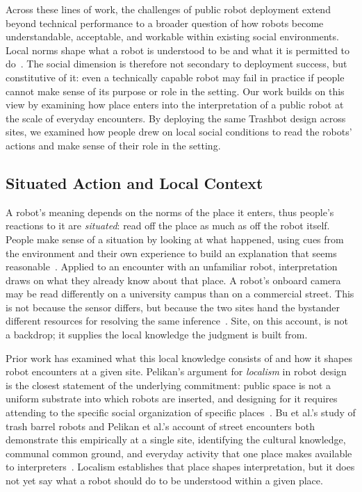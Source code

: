 Across these lines of work, the challenges of public robot deployment extend beyond technical performance to a broader question of how robots become understandable, acceptable, and workable within existing social environments. Local norms shape what a robot is understood to be and what it is permitted to do~\cite{while2021urban}. The social dimension is therefore not secondary to deployment success, but constitutive of it: even a technically capable robot may fail in practice if people cannot make sense of its purpose or role in the setting. 
Our work builds on this view by examining how place enters into the interpretation of a public robot at the scale of everyday encounters. By deploying the same Trashbot design across sites, we examined how people drew on local social conditions to read the robots' actions and make sense of their role in the setting.
  
  \subsection{Situated Action and Local Context} \label{sec:situated}
A robot's meaning depends on the norms of the place it enters, thus people's reactions to it are \textit{situated}: read off the place as much as off the robot itself. People make sense of a situation by looking at what happened, using cues from the environment and their own experience to build an explanation that seems reasonable~\cite{suchman1987plans, weick2005organizing}. Applied to an encounter with an unfamiliar robot, interpretation draws on what they already know about that place. A robot's onboard camera may be read differently on a university campus than on a commercial street. This is not because the sensor differs, but because the two sites hand the bystander different resources for resolving the same inference~\cite{denning2014insitu}. Site, on this account, is not a backdrop; it supplies the local knowledge the judgment is built from.

Prior work has examined what this local knowledge consists of and how it shapes robot encounters at a given site. Pelikan's argument for \textit{localism} in robot design is the closest statement of the underlying commitment: public space is not a uniform substrate into which robots are inserted, and designing for it requires attending to the specific social organization of specific places~\cite{pelikan2025localism}. Bu et al.'s study of trash barrel robots and Pelikan et al.'s account of street encounters both demonstrate this empirically at a single site, identifying the cultural knowledge, communal common ground, and everyday activity that one place makes available to interpreters~\cite{bu2025making, pelikan2024encountering}. Localism establishes that place shapes interpretation, but it does not yet say what a robot should do to be understood within a given place. 

